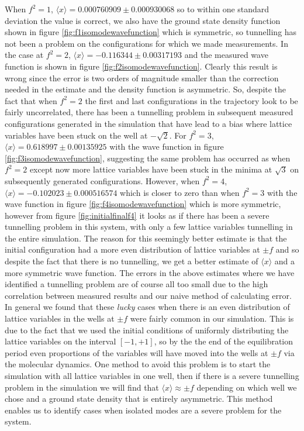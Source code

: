 \documentclass[12pt]{article}
\begin{document}
        When $f^2=1$, $\langle x \rangle = 0.000760909 \pm 0.000930068$ so to within one standard deviation the value is correct, we also have the ground state density function shown in figure \ref{fig:f1isomodewavefunction} which is symmetric, so tunnelling has not been a problem on the configurations for which we made measurements. In the case at $f^2=2$, $\langle x \rangle = -0.116344 \pm 0.00317193$ and the measured wave function is shown in figure \ref{fig:f2isomodewavefunction}. Clearly this result is wrong since the error is two orders of magnitude smaller than the correction needed in the estimate and the density function is asymmetric. So, despite the fact that when $f^2=2$ the first and last configurations in the trajectory look to be fairly uncorrelated, there has been a tunnelling problem in subsequent measured configurations generated in the simulation that have lead to a bias where lattice variables have been stuck on the well at $-\sqrt{2}$. For $f^2=3$, $\langle x \rangle =  0.618997 \pm 0.00135925$ with the wave function in figure \ref{fig:f3isomodewavefunction}, suggesting the same problem has occurred as when $f^2=2$ except now more lattice variables have been stuck in the minima at $\sqrt{3}$ on subsequently generated configurations. However, when $f^2=4$,  $\langle x \rangle =  -0.102023 \pm 0.000516574$ which is closer to zero than when $f^2=3$ with the wave function in figure \ref{fig:f4isomodewavefunction} which is more symmetric, however from figure \ref{fig:initialfinalf4} it looks as if there has been a severe tunnelling problem in this system, with only a few lattice variables tunnelling in the entire simulation. The reason for this seemingly better estimate is that the initial configuration had a more even distribution of lattice variables at $\pm f$ and so despite the fact that there is no tunnelling, we get a better estimate of $\langle x \rangle$ and a more symmetric wave function. The errors in the above estimates where we have identified a tunnelling problem are of course all too small due to the high correlation between measured results and our naive method of calculating error. In general we found that these \textit{lucky} cases when there is an even distribution of lattice variables in the wells at $\pm f$ were fairly common in our simulation. This is due to the fact that we used the initial conditions of uniformly distributing the lattice variables on the interval $\left[-1,+1\right]$, so by the the end of the equilibration period even proportions of the variables will have moved into the wells at $\pm f$ via the molecular dynamics. One method to avoid this problem is to start the simulation with all lattice variables in one well, then if there is a severe tunnelling problem in the simulation we will find that $\langle x \rangle \approx \pm f$ depending on which well we chose and a ground state density that is entirely asymmetric. This method enables us to identify cases when isolated modes are a severe problem for the system.
\end{document}
